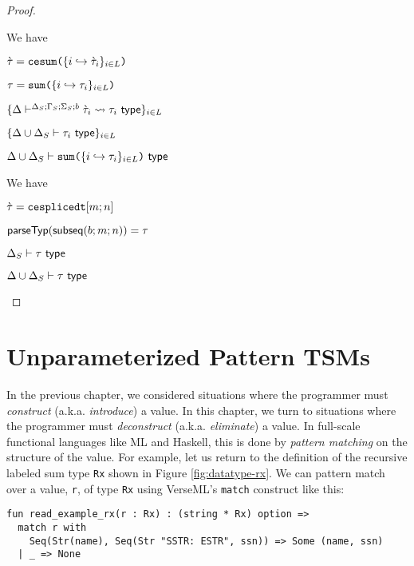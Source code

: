 \begin{proof}
\begin{byCases}
\item[\text{(\ref{rule:cvalidT-U-sum})}] We have
\begin{pfsteps*}
\item $\grave{\tau}=\texttt{cesum}\texttt{(}\{i \hookrightarrow \grave{\tau}_{i}\}_{i \in L}\texttt{)}$   
\item $\tau=\texttt{sum}\texttt{(}\{i \hookrightarrow \tau_{i}\}_{i \in L}\texttt{)}$ 
\item $\{\Delta\vdash^{\Delta_S; \Gamma_S; \Sigma_S; b} \grave{\tau}_i \leadsto \tau_i~\mathsf{type}\}_{i \in L}$  
\item $\{\Delta \cup \Delta_S \vdash \tau_i~\mathsf{type}\}_{i \in L}$  
\item $\Delta \cup \Delta_S \vdash \texttt{sum}\texttt{(}\{i \hookrightarrow \tau_{i}\}_{i \in L}\texttt{)}~\mathsf{type}$ 
\end{pfsteps*}
\resetpfcounter

\item[\text{(\ref{rule:cvalidT-U-splicedt})}] We have
\begin{pfsteps*}
\item $\grave{\tau}=\texttt{cesplicedt}[m; n]$ 
\item $\mathsf{parseTyp}(\mathsf{subseq}(b; m; n))=\tau$ 
\item $\Delta_S \vdash \tau~\mathsf{type}$ 
\item $\Delta \cup \Delta_S \vdash \tau~\mathsf{type}$ 
\end{pfsteps*}
\end{byCases}
\end{proof}

\chapter{Unparameterized Pattern TSMs}\label{sec:pattern-tsms}
In the previous chapter, we considered situations where the programmer must \emph{construct} (a.k.a. \emph{introduce}) a value. In this chapter, we turn to situations where the programmer must \emph{deconstruct} (a.k.a. \emph{eliminate}) a value. In full-scale functional languages like ML and Haskell, this is done by \emph{pattern matching} on the structure of the value. For example, let us return to the definition of the recursive labeled sum type \lstinline{Rx} shown in Figure \ref{fig:datatype-rx}. We can pattern match over a value, \lstinline{r}, of type \lstinline{Rx} using VerseML's \lstinline{match} construct like this:
\begin{lstlisting}
fun read_example_rx(r : Rx) : (string * Rx) option => 
  match r with 
    Seq(Str(name), Seq(Str "SSTR: ESTR", ssn)) => Some (name, ssn)
  | _ => None
\end{lstlisting}

